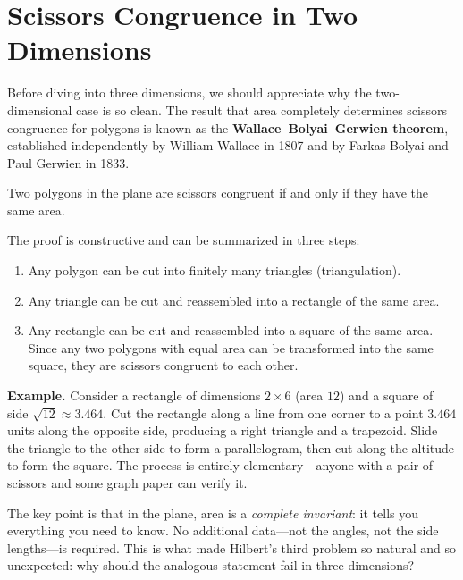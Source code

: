 \section{Scissors Congruence in Two Dimensions}

Before diving into three dimensions, we should appreciate why the two-dimensional case is so clean. The result that area completely determines scissors congruence for polygons is known as the \textbf{Wallace--Bolyai--Gerwien theorem}, established independently by William Wallace in 1807 and by Farkas Bolyai and Paul Gerwien in 1833.

\begin{theorem}\label{thm:wbg}
Two polygons in the plane are scissors congruent if and only if they have the same area.
\end{theorem}

The proof is constructive and can be summarized in three steps:

\begin{enumerate}
    \item Any polygon can be cut into finitely many triangles (triangulation).
    \item Any triangle can be cut and reassembled into a rectangle of the same area.
    \item Any rectangle can be cut and reassembled into a square of the same area. Since any two polygons with equal area can be transformed into the same square, they are scissors congruent to each other.
\end{enumerate}

\vspace{0.25em}
\noindent \textbf{Example.} Consider a rectangle of dimensions $2 \times 6$ (area $12$) and a square of side $\sqrt{12} \approx 3.464$. Cut the rectangle along a line from one corner to a point $3.464$ units along the opposite side, producing a right triangle and a trapezoid. Slide the triangle to the other side to form a parallelogram, then cut along the altitude to form the square. The process is entirely elementary---anyone with a pair of scissors and some graph paper can verify it.

The key point is that in the plane, area is a \emph{complete invariant}: it tells you everything you need to know. No additional data---not the angles, not the side lengths---is required. This is what made Hilbert's third problem so natural and so unexpected: why should the analogous statement fail in three dimensions?

